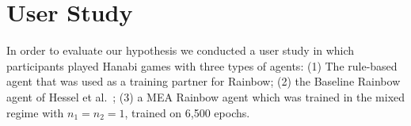 \documentclass[letterpaper]{article} %
\begin{document}



\section{User Study}
In order to evaluate our hypothesis we conducted a user study in which participants played Hanabi games
with three types of agents: (1) The rule-based agent that was used as a training partner for Rainbow; (2) the Baseline Rainbow agent of Hessel et al.~\cite{hessel2018rainbow}; (3) a MEA Rainbow agent which was trained in the mixed regime with $n_1=n_2=1$, trained on 6,500 epochs.



\end{document}
